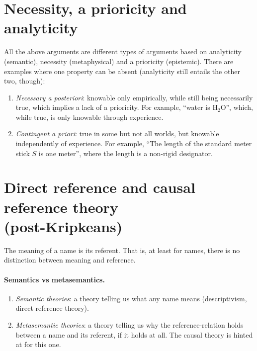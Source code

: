 \section{Necessity, a prioricity and analyticity}

All the above arguments are different types of arguments based on analyticity (semantic), necessity (metaphysical) and a prioricity (epistemic). There are examples where one property can be absent (analyticity still entails the other two, though):
\begin{enumerate}[label=\roman*.]
  \item \emph{Necessary a posteriori}: knowable only empirically, while still being necessarily true, which implies a lack of a prioricity. For example, ``water is H$_2$O'', which, while true, is only knowable through experience.
  \item \emph{Contingent a priori}: true in some but not all worlds, but knowable independently of experience. For example, ``The length of the standard meter stick $S$ is one meter'', where the length is a non-rigid designator.
\end{enumerate}

\section[Direct reference and causal reference theory]{Direct reference and causal reference theory\\ (post-Kripkeans)}

\begin{definition}
The meaning of a name is its referent. That is, at least for names, there is no distinction between meaning and reference.
\end{definition}

\paragraph{Semantics vs metasemantics.}
\begin{enumerate}
  \item \emph{Semantic theories}: a theory telling us what any name means (descriptivism, direct reference theory).
  \item \emph{Metasemantic theories}: a theory telling us why the reference-relation holds between a name and its referent, if it holds at all. The causal theory is hinted at for this one.
\end{enumerate}


